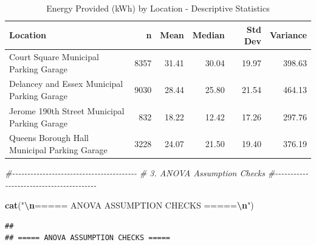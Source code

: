 \documentclass[
  12pt,
]{article}
\newenvironment{Shaded}{\begin{snugshade}}{\end{snugshade}}
\newcommand{\CommentTok}[1]{\textcolor[rgb]{0.56,0.35,0.01}{\textit{#1}}}
\newcommand{\FunctionTok}[1]{\textcolor[rgb]{0.13,0.29,0.53}{\textbf{#1}}}
\newcommand{\NormalTok}[1]{#1}
\newcommand{\SpecialCharTok}[1]{\textcolor[rgb]{0.81,0.36,0.00}{\textbf{#1}}}
\newcommand{\StringTok}[1]{\textcolor[rgb]{0.31,0.60,0.02}{#1}}
\begin{document}
\begin{longtable}[t]{lrrrrr}
\caption{\label{tab:unnamed-chunk-15}Energy Provided (kWh) by Location - Descriptive Statistics}\\
\toprule
Location & n & Mean & Median & Std Dev & Variance\\
\midrule
Court Square Municipal Parking Garage & 8357 & 31.41 & 30.04 & 19.97 & 398.63\\
Delancey and Essex Municipal Parking Garage & 9030 & 28.44 & 25.80 & 21.54 & 464.13\\
Jerome 190th Street Municipal Parking Garage & 832 & 18.22 & 12.42 & 17.26 & 297.76\\
Queens Borough Hall Municipal Parking Garage & 3228 & 24.07 & 21.50 & 19.40 & 376.19\\
\bottomrule
\end{longtable}

\begin{Shaded}
\begin{Highlighting}[]
\CommentTok{\#{-}{-}{-}{-}{-}{-}{-}{-}{-}{-}{-}{-}{-}{-}{-}{-}{-}{-}{-}{-}{-}{-}{-}{-}{-}{-}{-}{-}{-}{-}{-}{-}{-}{-}{-}{-}{-}{-}{-}{-}{-}}
\CommentTok{\# 3. ANOVA Assumption Checks}
\CommentTok{\#{-}{-}{-}{-}{-}{-}{-}{-}{-}{-}{-}{-}{-}{-}{-}{-}{-}{-}{-}{-}{-}{-}{-}{-}{-}{-}{-}{-}{-}{-}{-}{-}{-}{-}{-}{-}{-}{-}{-}{-}{-}}

\FunctionTok{cat}\NormalTok{(}\StringTok{"}\SpecialCharTok{\textbackslash{}n}\StringTok{===== ANOVA ASSUMPTION CHECKS =====}\SpecialCharTok{\textbackslash{}n}\StringTok{"}\NormalTok{)}
\end{Highlighting}
\end{Shaded}

\begin{verbatim}
## 
## ===== ANOVA ASSUMPTION CHECKS =====
\end{verbatim}
\end{document}
